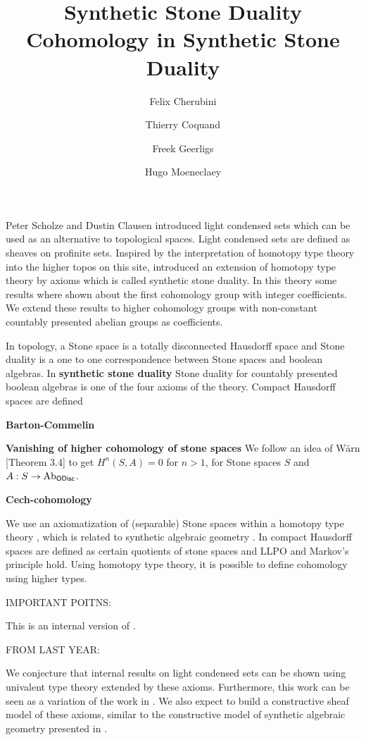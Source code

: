 \documentclass{../util/zariski}
\title{Synthetic Stone Duality 
}
\author{
Felix Cherubini %
\and 
 Thierry Coquand%
\and 
 Freek Geerligs%
\and
 Hugo Moeneclaey %
}
\title{Cohomology in Synthetic Stone Duality}
\begin{document}
\maketitle
Peter Scholze and Dustin Clausen \cite{Scholze} introduced light condensed sets which can be used as an alternative to topological spaces. Light condensed sets are defined as sheaves on profinite sets.
Inspired by the interpretation of homotopy type theory into the higher topos on this site, \cite{synthetic-stone-duality} introduced an extension of homotopy type theory by axioms which is called synthetic stone duality. In this theory some results where shown about the first cohomology group with integer coefficients. We extend these results to higher cohomology groups with non-constant countably presented abelian groups as coefficients.

In topology, a Stone space is a totally disconnected Hausdorff space and Stone duality is a one to one correspondence between Stone spaces and boolean algebras. In \textbf{synthetic stone duality} Stone duality for countably presented boolean algebras is one of the four axioms of the theory. Compact Hausdorff spaces are defined 

\textbf{Barton-Commelin}

\textbf{Vanishing of higher cohomology of stone spaces}
We follow an idea of Wärn \cite{cech-draft}[Theorem 3.4] to get $H^n(S,A)=0$ for $n>1$, for Stone spaces $S$ and $A : S\to \mathrm{Ab}_{\mathsf{ODisc}}$.

\textbf{Cech-cohomology}

We use an axiomatization of (separable) Stone spaces within a homotopy type theory \cite{synthetic-stone-duality}, which is related to synthetic algebraic geometry \cite{draft}.
In \cite{synthetic-stone-duality} compact Hausdorff spaces are defined as certain quotients of stone spaces and LLPO and Markov's principle hold.
Using homotopy type theory, it is possible to define cohomology using higher types.

IMPORTANT POITNS:

This is an internal version of \cite{dyckhoff76}.

FROM LAST YEAR:

We conjecture that internal results on light condensed sets \cite{Dagur,Scholze,Condensed} can be shown using univalent
type theory extended by these axioms.
Furthermore, this work can be seen as a variation of the work in \cite{XuE13}. We also expect to build a constructive
sheaf model of these axioms, similar to the constructive model of synthetic algebraic geometry presented in \cite{draft}.
\end{document}
